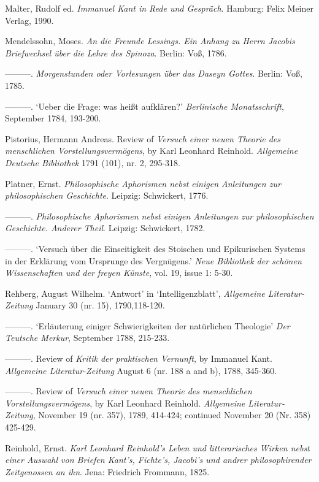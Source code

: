 Malter, Rudolf ed. \textit{Immanuel Kant in Rede und Gespr\"{a}ch}. Hamburg: Felix Meiner Verlag, 1990.

Mendelssohn, Moses. \textit{An die Freunde Lessings. Ein Anhang zu Herrn Jacobis Briefwechsel \"{u}ber die Lehre des Spinoza}. Berlin: Vo\ss{}, 1786.

{---}{---}{---}.\textit{ Morgenstunden oder Vorlesungen \"{u}ber das Daseyn Gottes}. Berlin: Vo\ss{}, 1785.

{---}{---}{---}. `Ueber die Frage: was hei\ss{}t aufkl\"{a}ren?' \textit{Berlinische Monatsschrift}, September 1784, 193{-}200.

Pistorius, Hermann Andreas. Review of \textit{Versuch einer neuen Theorie des menschlichen Vorstellungsverm\"{o}gens}, by Karl Leonhard Reinhold. \textit{Allgemeine Deutsche Bibliothek} 1791 (101), nr. 2, 295{-}318.

Platner, Ernst. \textit{Philosophische Aphorismen nebst einigen Anleitungen zur philosophischen Geschichte}. Leipzig: Schwickert, 1776.

{---}{---}{---}.\textit{ Philosophische Aphorismen nebst einigen Anleitungen zur philosophischen Geschichte. Anderer Theil}. Leipzig: Schwickert, 1782.

{---}{---}{---}. `Versuch \"{u}ber die Einseitigkeit des Stoischen und Epikurischen Systems in der Erkl\"{a}rung vom Ursprunge des Vergn\"{u}gens.' \textit{Neue Bibliothek der sch\"{o}nen Wissenschaften und der freyen K\"{u}nste}, vol. 19, issue 1: 5{-}30.

Rehberg, August Wilhelm. `Antwort' in `Intelligenzblatt', \textit{Allgemeine Literatur{-}Zeitung} January 30 (nr. 15), 1790,118{-}120.

{---}{---}{---}. `Erl\"{a}uterung einiger Schwierigkeiten der nat\"{u}rlichen Theologie' \textit{Der Teutsche Merkur}, September 1788, 215{-}233.

{---}{---}{---}. Review of \textit{Kritik der praktischen Vernunft}, by Immanuel Kant. \textit{Allgemeine Literatur{-}Zeitung} August 6 (nr. 188 a and b), 1788, 345{-}360.

{---}{---}{---}. Review of \textit{Versuch einer neuen Theorie des menschlichen Vorstellungsverm\"{o}gens}, by Karl Leonhard Reinhold.\textit{ Allgemeine Literatur{-}Zeitung}, November 19 (nr. 357), 1789, 414{-}424; continued November 20 (Nr. 358) 425{-}429.

Reinhold, Ernst. \textit{Karl Leonhard Reinhold's Leben und litterarisches Wirken nebst einer Auswahl von Briefen Kant's, Fichte's, Jacobi's und andrer philosophirender Zeitgenossen an ihn}. Jena: Friedrich Frommann, 1825.

